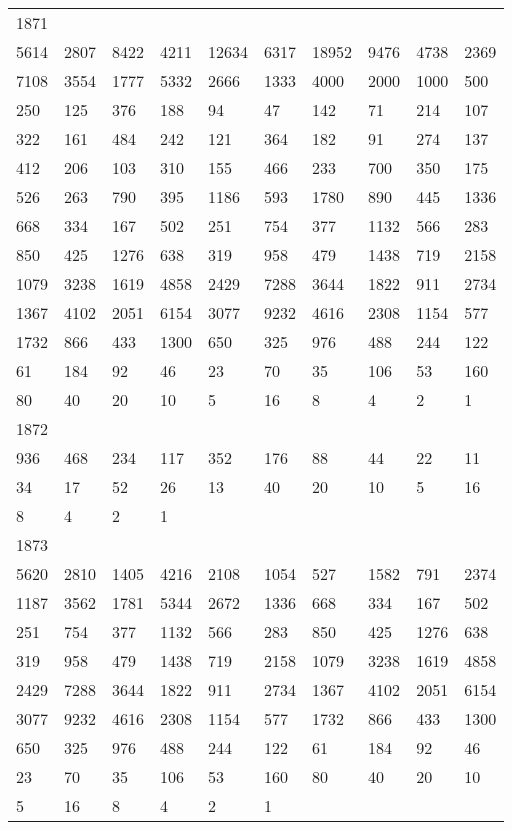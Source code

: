 \begin{longtable}{*{10}{l}}
1871&&&&&&&&&\\
5614& 2807& 8422& 4211& 12634& 6317& 18952& 9476& 4738& 2369\\
7108& 3554& 1777& 5332& 2666& 1333& 4000& 2000& 1000& 500\\
250& 125& 376& 188& 94& 47& 142& 71& 214& 107\\
322& 161& 484& 242& 121& 364& 182& 91& 274& 137\\
412& 206& 103& 310& 155& 466& 233& 700& 350& 175\\
526& 263& 790& 395& 1186& 593& 1780& 890& 445& 1336\\
668& 334& 167& 502& 251& 754& 377& 1132& 566& 283\\
850& 425& 1276& 638& 319& 958& 479& 1438& 719& 2158\\
1079& 3238& 1619& 4858& 2429& 7288& 3644& 1822& 911& 2734\\
1367& 4102& 2051& 6154& 3077& 9232& 4616& 2308& 1154& 577\\
1732& 866& 433& 1300& 650& 325& 976& 488& 244& 122\\
61& 184& 92& 46& 23& 70& 35& 106& 53& 160\\
80& 40& 20& 10& 5& 16& 8& 4& 2& 1\\

1872&&&&&&&&&\\
936& 468& 234& 117& 352& 176& 88& 44& 22& 11\\
34& 17& 52& 26& 13& 40& 20& 10& 5& 16\\
8& 4& 2& 1& \\

1873&&&&&&&&&\\
5620& 2810& 1405& 4216& 2108& 1054& 527& 1582& 791& 2374\\
1187& 3562& 1781& 5344& 2672& 1336& 668& 334& 167& 502\\
251& 754& 377& 1132& 566& 283& 850& 425& 1276& 638\\
319& 958& 479& 1438& 719& 2158& 1079& 3238& 1619& 4858\\
2429& 7288& 3644& 1822& 911& 2734& 1367& 4102& 2051& 6154\\
3077& 9232& 4616& 2308& 1154& 577& 1732& 866& 433& 1300\\
650& 325& 976& 488& 244& 122& 61& 184& 92& 46\\
23& 70& 35& 106& 53& 160& 80& 40& 20& 10\\
5& 16& 8& 4& 2& 1& \\


\end{longtable}
